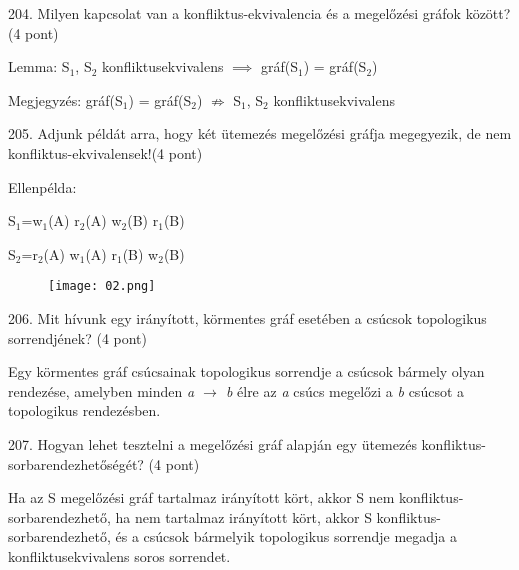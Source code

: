 \documentclass[a4paper,11.5pt, table]{article}
\begin{document}
204. Milyen kapcsolat van a konfliktus-ekvivalencia és a megelőzési gráfok között? (4 pont)
	\begin{compactitem}
		\item Lemma: S$ _{1} $, S$ _{2} $ konfliktusekvivalens $ \implies $ gráf(S$ _{1} $) = gráf(S$ _{2} $)
		\item Megjegyzés: gráf(S$ _{1} $) = gráf(S$ _{2} $) $ \not\Rightarrow $ S$ _{1} $, S$ _{2} $ konfliktusekvivalens
	\end{compactitem}

205. Adjunk példát arra, hogy két ütemezés megelőzési gráfja megegyezik, de nem konfliktus-ekvivalensek!(4 pont)
	\begin{compactitem}
		\item Ellenpélda:
		\begin{compactitem}
			\item S$ _{1} $=w$ _{1} $(A) r$ _{2} $(A) w$ _{2} $(B) r$ _{1} $(B)
			\item S$ _{2} $=r$ _{2} $(A) w$ _{1} $(A) r$ _{1} $(B) w$ _{2} $(B)
		\end{compactitem}
			\begin{figure}[h]
				\centering
				\texttt{[image: 02.png]}
			\end{figure}
	\end{compactitem}


206. Mit hívunk egy irányított, körmentes gráf esetében a csúcsok topologikus sorrendjének? (4 pont)
	\begin{compactitem}
		\item Egy körmentes gráf csúcsainak topologikus sorrendje a csúcsok bármely olyan rendezése, amelyben minden \textit{a $ \rightarrow $ b} élre az \textit{a} csúcs megelőzi a \textit{b} csúcsot a topologikus rendezésben.
	\end{compactitem}

207. Hogyan lehet tesztelni a megelőzési gráf alapján egy ütemezés konfliktus-sorbarendezhetőségét? (4 pont)
	\begin{compactitem}
		\item Ha az S megelőzési gráf tartalmaz irányított kört, akkor S nem konfliktus-sorbarendezhető, ha nem tartalmaz irányított kört, akkor S konfliktus-sorbarendezhető, és a csúcsok bármelyik topologikus sorrendje megadja a konfliktusekvivalens soros sorrendet.
	\end{compactitem}
\end{document}
